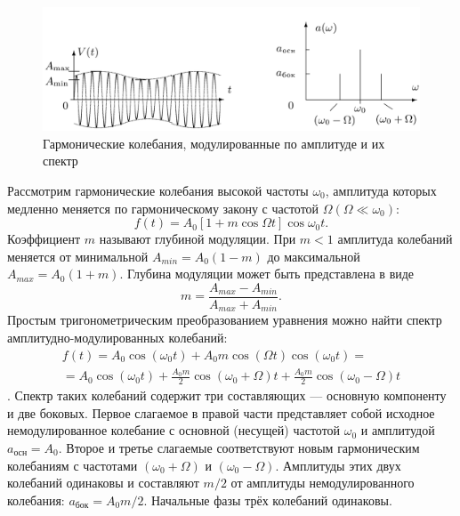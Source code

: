 \documentclass[a4paper, fontsize=14pt]{article}
\begin{document}
\begin{figure}[H]
\center
\includegraphics[scale=0.2]{gr3.png}
\caption{Гармонические колебания, модулированные по амплитуде и их спектр}
\end{figure}
Рассмотрим гармонические колебания высокой частоты $\omega_0$, амплитуда которых медленно меняется по гармоническому закону с частотой $\Omega (\Omega \ll \omega_0)$:
\[
	f(t) = A_0 [1 + m \cos \Omega t] \cos \omega_0 t.
\]
Коэффициент $m$ называют глубиной модуляции. При $m < 1$ амплитуда колебаний меняется от минимальной $A_{min} = A_0 (1 - m)$ до максимальной $A_{max} = A_0 (1 + m)$. Глубина модуляции может быть представлена в виде
\[
	m = \frac{A_{max} - A_{min}}{A_{max} + A_{min}}.
\]
Простым тригонометрическим преобразованием уравнения можно найти спектр амплитудно-модулированных колебаний:
\[
\begin{array}{c}{f(t)=A_{0} \cos \left(\omega_{0} t\right)+A_{0} m \cos (\Omega t) \cos \left(\omega_{0} t\right)=} \\ {=A_{0} \cos \left(\omega_{0} t\right)+\frac{A_{0} m}{2} \cos \left(\omega_{0}+\Omega\right) t+\frac{A_{0} m}{2} \cos \left(\omega_{0}-\Omega\right) t}\end{array}
\].
Спектр таких колебаний содержит три составляющих --- основную компоненту и две боковых. Первое слагаемое в правой части представляет собой исходное немодулированное колебание с основной (несущей) частотой $\omega_0$ и амплитудой $a_\text{осн} = A_0$. Второе и третье слагаемые соответствуют новым гармоническим колебаниям с частотами $(\omega_0 + \Omega)$ и $(\omega_0 - \Omega)$. Амплитуды этих двух колебаний одинаковы и составляют $m / 2$ от амплитуды немодулированного колебания: $a_\text{бок} = A_0 m / 2$. Начальные фазы трёх колебаний одинаковы.
\newpage
\end{document}
